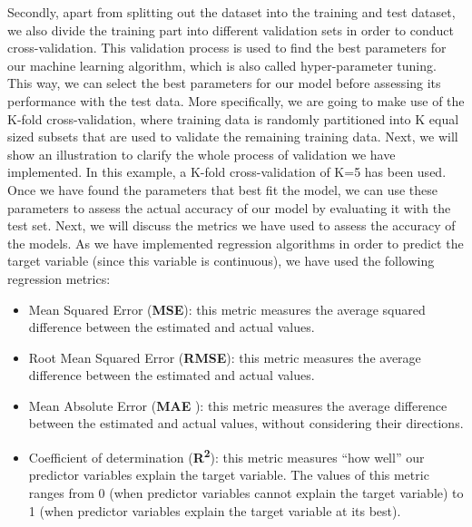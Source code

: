 Secondly, apart from splitting out the dataset into the training and test dataset, we also divide the training part into different validation sets in order to conduct cross-validation. This validation process is used to find the best parameters for our machine learning algorithm, which is also called hyper-parameter tuning. This way, we can select the best parameters for our model before assessing its performance with the test data. More specifically, we are going to make use of the K-fold cross-validation, where training data is randomly partitioned into K equal sized subsets that are used to validate the remaining training data. Next, we will show an illustration to clarify the whole process of validation we have implemented. In this example, a K-fold cross-validation of K=5 has been used.\\


Once we have found the parameters that best fit the model, we can use these parameters to assess the actual accuracy of our model by evaluating it with the test set. Next, we will discuss the metrics we have used to assess the accuracy of the models. As we have implemented regression algorithms in order to predict the target variable (since this variable is continuous), we have used the following regression metrics:

\begin{itemize}

	\item Mean Squared Error (\textbf{MSE}): this metric measures the average squared difference between the estimated and actual values.
	
	\item Root Mean Squared Error (\textbf{RMSE}): this metric measures the average difference between the estimated and actual values.
	
	\item Mean Absolute Error (\textbf{MAE} ): this metric measures the average difference between the estimated and actual values, without considering their directions.
	
	\item Coefficient of determination (\textbf{R\textsuperscript{2}}): this metric measures “how well” our predictor variables explain the target variable. The values of this metric ranges from 0 (when predictor variables cannot explain the target variable) to 1 (when predictor variables explain the target variable at its best).

\end{itemize}

